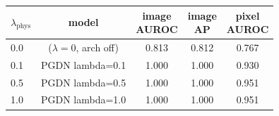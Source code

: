 \setlength{\tabcolsep}{3pt}
\begin{tabular}{@{}lcccc@{}}
\toprule
$\lambda_{\mathrm{phys}}$ & model & \shortstack{image\\AUROC} & \shortstack{image\\AP} & \shortstack{pixel\\AUROC} \\
\midrule
0.0 & \shortstack[l]{\draem{}\\($\lambda{=}0$, arch off)} & 0.813 & 0.812 & 0.767 \\
0.1 & PGDN lambda=0.1 & 1.000 & 1.000 & 0.930 \\
0.5 & PGDN lambda=0.5 & 1.000 & 1.000 & 0.951 \\
1.0 & PGDN lambda=1.0 & 1.000 & 1.000 & 0.951 \\
\bottomrule
\end{tabular}
